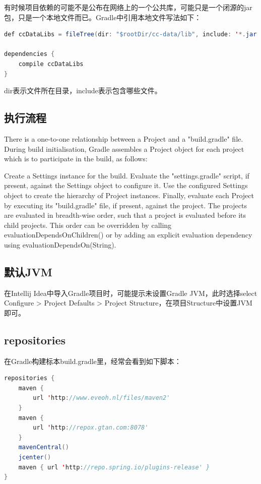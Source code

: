 \documentclass[letter]{book}
\begin{document}
有时候项目依赖的可能不是公布在网络上的一个公共库，可能只是一个闭源的jar包，只是一个本地文件而已。Gradle中引用本地文件写法如下：

\begin{lstlisting}[language=Java]
def ccDataLibs = fileTree(dir: "$rootDir/cc-data/lib", include: '*.jar')

dependencies {
	compile ccDataLibs
}
\end{lstlisting}

dir表示文件所在目录，include表示包含哪些文件。

\subsection{执行流程}

There is a one-to-one relationship between a Project and a "build.gradle" file. During build initialisation, Gradle assembles a Project object for each project which is to participate in the build, as follows:

Create a Settings instance for the build.
Evaluate the "settings.gradle" script, if present, against the Settings object to configure it.
Use the configured Settings object to create the hierarchy of Project instances.
Finally, evaluate each Project by executing its "build.gradle" file, if present, against the project. The projects are evaluated in breadth-wise order, such that a project is evaluated before its child projects. This order can be overridden by calling evaluationDependsOnChildren() or by adding an explicit evaluation dependency using evaluationDependsOn(String).

\subsection{默认JVM}

在Intellij Idea中导入Gradle项目时，可能提示未设置Gradle JVM，此时选择select Configure > Project Defaults > Project Structure，在项目Structure中设置JVM即可。

\subsection{repositories}

在Gradle构建标本build.gradle里，经常会看到如下脚本：

\begin{lstlisting}[language=Java]
repositories {
	maven {
		url 'http://www.eveoh.nl/files/maven2'
	}
	maven {
		url 'http://repox.gtan.com:8078'
	}
	mavenCentral()
	jcenter()
	maven { url 'http://repo.spring.io/plugins-release' }
}
\end{lstlisting}
\end{document}
